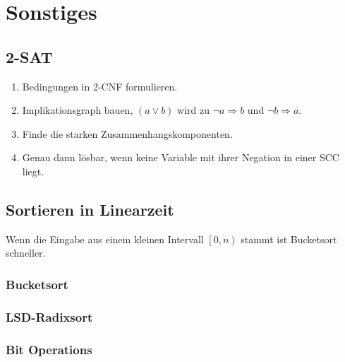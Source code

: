 \section{Sonstiges}

\subsection{2-SAT}
\begin{enumerate}
	\item Bedingungen in 2-CNF formulieren.
	\item Implikationsgraph bauen, $\left(a \vee b\right)$ wird zu $\neg a \Rightarrow b$ und $\neg b \Rightarrow a$.
	\item Finde die starken Zusammenhangskomponenten.
	\item Genau dann lösbar, wenn keine Variable mit ihrer Negation in einer SCC liegt.
\end{enumerate}

\subsection{Sortieren in Linearzeit}
Wenn die Eingabe aus einem kleinen Intervall $\left[0, n\right)$ stammt ist Bucketsort schneller.

\subsubsection{Bucketsort}


\subsubsection{LSD-Radixsort}


\subsubsection{Bit Operations}

